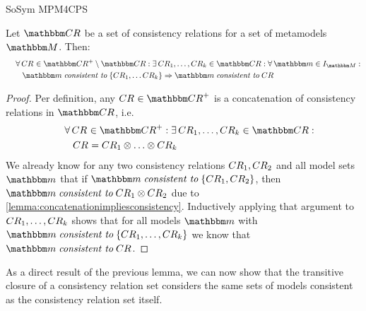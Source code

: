 \begin{copiedFrom}{SoSym MPM4CPS}
\begin{lemma}
    Let $\consistencyrelationset{CR}$ be a set of consistency relations for a set of metamodels $\metamodelset{M}$. Then:
    \begin{align*}
        \formulaskip &
        \forall \consistencyrelation{CR}{} \in \transitiveclosure{\consistencyrelationset{CR}{}} \setminus \consistencyrelationset{CR} :
        \exists \consistencyrelation{CR}{1}, \dots, \consistencyrelation{CR}{k} \in \consistencyrelationset{CR} : \forall \modelset{m} \in \metamodelinstances{\metamodelset{M}} : \\
        & \formulaskip
        \modelset{m} \consistenttomath \setted{\consistencyrelation{CR}{1}, \dots \consistencyrelation{CR}{k}} \Rightarrow \modelset{m} \consistenttomath \consistencyrelation{CR}{} 
    \end{align*}
\end{lemma}

\begin{proof}
    Per definition, any $\consistencyrelation{CR}{} \in \transitiveclosure{\consistencyrelationset{CR}}$ is a concatenation of consistency relations in $\consistencyrelationset{CR}$, i.e.
    \begin{align*}
        \formulaskip &
        \forall \consistencyrelation{CR}{} \in \transitiveclosure{\consistencyrelationset{CR}} : \exists \consistencyrelation{CR}{1}, \dots, \consistencyrelation{CR}{k} \in \consistencyrelationset{CR} : \\
        & \formulaskip 
        \consistencyrelation{CR}{} = \consistencyrelation{CR}{1} \concat \dots \concat \consistencyrelation{CR}{k}
    \end{align*}
    We already know for any two consistency relations $CR_{1}, CR_{2}$ and all model sets $\modelset{m}$ that if $\modelset{m} \consistenttomath \setted{\consistencyrelation{CR}{1}, \consistencyrelation{CR}{2}}$, then $\modelset{m} \consistenttomath \consistencyrelation{CR}{1} \concat \consistencyrelation{CR}{2}$ due to \autoref{lemma:concatenationimpliesconsistency}.
    Inductively applying that argument to $CR_{1}, \dots, CR_{k}$ shows that for all models $\modelset{m}$ with $\modelset{m} \consistenttomath \setted{\consistencyrelation{CR}{1}, \dots, \consistencyrelation{CR}{k}}$ we know that $\modelset{m} \consistenttomath \consistencyrelation{CR}{}$.
\end{proof}

As a direct result of the previous lemma, we can now show that the transitive closure of a consistency relation set considers the same sets of models consistent as the consistency relation set itself.


\end{copiedFrom}
